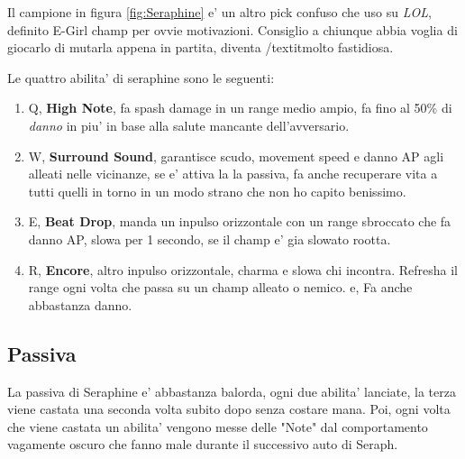 \documentclass{report}
\begin{document}
    Il campione in figura \ref{fig:Seraphine} e' un altro pick confuso che uso su \emph{LOL}, definito E-Girl champ per ovvie motivazioni.
    Consiglio a chiunque abbia voglia di giocarlo di mutarla appena in partita, diventa /textit{molto} fastidiosa.
    
    Le quattro abilita' di seraphine sono le seguenti:
    \begin{enumerate}
        \item Q, \textbf{High Note}, fa spash damage in un range medio ampio, fa fino al 50\% di \textit{danno} in piu' in base alla salute mancante dell'avversario.
        \item W, \textbf{Surround Sound}, garantisce scudo, movement speed e danno \textcolor{ApBlue}{AP} agli alleati nelle vicinanze, se e' attiva la\nolinebreak
        la passiva, fa anche recuperare vita a tutti quelli in torno in un modo strano che non ho capito benissimo.
        \item E, \textbf{Beat Drop}, manda un inpulso orizzontale con un range sbroccato che fa danno \textcolor{ApBlue}{AP}, slowa per 1 secondo, se il champ e' gia slowato rootta.
        \item R, \textbf{Encore}, altro inpulso orizzontale, charma e slowa chi incontra. Refresha il range ogni volta che passa su un champ alleato o nemico. e, Fa anche abbastanza danno.
    \end{enumerate}
    \subsection{Passiva}
    La passiva di Seraphine e' abbastanza balorda, ogni due abilita' lanciate, la terza viene castata una seconda volta subito dopo senza costare mana.\nolinebreak
    Poi, ogni volta che viene castata un abilita' vengono messe delle "Note" dal comportamento vagamente oscuro che fanno male durante il successivo auto di Seraph.
\end{document}
